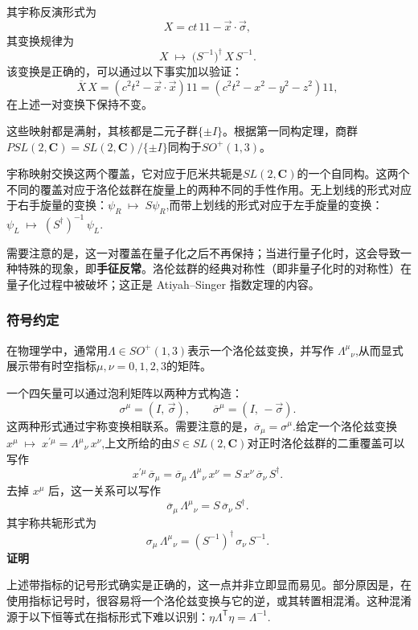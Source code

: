 其宇称反演形式为
\[
X = ct\,1\!\!1 - \vec{x}\cdot\vec{\sigma},~
\]
其变换规律为
\[
X \;\mapsto\; \bigl(S^{-1}\bigr)^{\dagger}\, X \, S^{-1}.~
\]
该变换是正确的，可以通过以下事实加以验证：
\[
\overline{X}\,X = \left(c^{2}t^{2} - \vec{x}\cdot \vec{x}\right)1\!\!1
= \left(c^{2}t^{2} - x^{2} - y^{2} - z^{2}\right)1\!\!1,~
\]
在上述一对变换下保持不变。

这些映射都是满射，其核都是二元子群$\{\pm I\}$。根据第一同构定理，商群$PSL(2,\mathbf{C}) = SL(2,\mathbf{C}) / \{\pm I\}$同构于$SO^{+}(1,3)$。

宇称映射交换这两个覆盖，它对应于厄米共轭是$SL(2,\mathbf{C})$的一个自同构。这两个不同的覆盖对应于洛伦兹群在旋量上的两种不同的手性作用。无上划线的形式对应于右手旋量的变换：$\psi_{R} \;\mapsto\; S \psi_{R}$,而带上划线的形式对应于左手旋量的变换：$\psi_{L} \;\mapsto\; (S^{\dagger})^{-1}\,\psi_{L}$.

需要注意的是，这一对覆盖在量子化之后不再保持；当进行量子化时，这会导致一种特殊的现象，即\textbf{手征反常}。洛伦兹群的经典对称性（即非量子化时的对称性）在量子化过程中被破坏；这正是 Atiyah–Singer 指数定理的内容。
\subsubsection{符号约定}
在物理学中，通常用$\Lambda \in SO^{+}(1,3)$表示一个洛伦兹变换，并写作
${\Lambda^{\mu}}_{\nu}$,从而显式展示带有时空指标$\mu,\nu = 0,1,2,3$的矩阵。

一个四矢量可以通过泡利矩阵以两种方式构造：
\[
\sigma^{\mu} = (I,\, \vec{\sigma}),
\qquad
\overline{\sigma}^{\mu} = (I,\, -\vec{\sigma}).~
\]
这两种形式通过宇称变换相联系。需要注意的是，$\overline{\sigma}_{\mu} = \sigma^{\mu}$.给定一个洛伦兹变换$x^{\mu} \;\mapsto\; x^{\prime \mu} = {\Lambda^{\mu}}_{\nu}\, x^{\nu}$,上文所给的由$S \in SL(2,\mathbf{C})$对正时洛伦兹群的二重覆盖可以写作
\[
x^{\prime \mu}\,\overline{\sigma}_{\mu}
= \overline{\sigma}_{\mu}\,{\Lambda^{\mu}}_{\nu}\,x^{\nu}
= S \, x^{\nu}\,\overline{\sigma}_{\nu}\, S^{\dagger}.~
\]
去掉 $x^{\mu}$ 后，这一关系可以写作
\[
\overline{\sigma}_{\mu}\,{\Lambda^{\mu}}_{\nu}
= S \,\overline{\sigma}_{\nu}\, S^{\dagger}.~
\]
其宇称共轭形式为
\[
\sigma_{\mu}\,{\Lambda^{\mu}}_{\nu}
= \left(S^{-1}\right)^{\dagger}\,\sigma_{\nu}\,S^{-1}.~
\]
\textbf{证明}

上述带指标的记号形式确实是正确的，这一点并非立即显而易见。部分原因是，在使用指标记号时，很容易将一个洛伦兹变换与它的逆，或其转置相混淆。这种混淆源于以下恒等式在指标形式下难以识别：$\eta \Lambda^{\textsf{T}} \eta = \Lambda^{-1}$.

